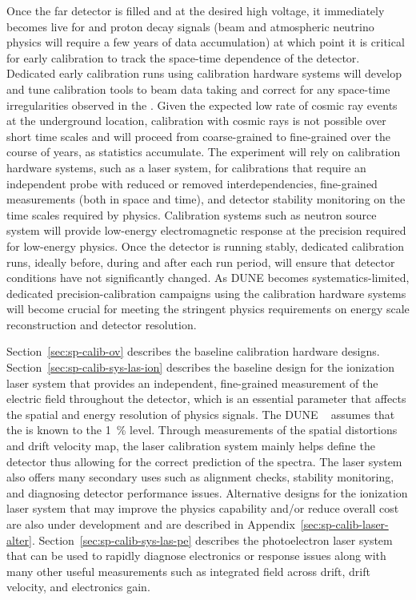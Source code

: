 Once the far detector is filled and at the desired high voltage, it immediately becomes live for  and proton decay signals (beam and atmospheric neutrino physics will require a few years of data accumulation) at which point it is critical for %
early calibration to track %
the space-time dependence of the detector. Dedicated early calibration runs using calibration hardware systems will develop and tune calibration tools to beam data taking and correct for any space-time irregularities observed in the . Given the expected low rate of cosmic ray events at the underground location, calibration with cosmic rays is not possible over short time scales and will proceed from coarse-grained to fine-grained over the course of years, as statistics accumulate. 
The experiment will rely on calibration hardware systems, such as a laser system, for calibrations that require an independent probe with reduced or removed interdependencies, fine-grained measurements (both in space and time), and detector stability monitoring on the time scales required by physics. Calibration systems such as neutron source system will provide low-energy electromagnetic response at the precision required for low-energy  physics. 
Once the detector is running stably, dedicated calibration runs, ideally before, during and after each run period, will ensure that detector conditions have not significantly changed. As DUNE becomes systematics-limited, dedicated precision-calibration campaigns using the calibration hardware systems will become crucial for meeting the stringent physics requirements on energy scale reconstruction and detector resolution.

Section~\ref{sec:sp-calib-ov} describes the baseline calibration hardware designs. Section~\ref{sec:sp-calib-sys-las-ion} describes the baseline design for the ionization laser system that provides an independent, fine-grained measurement of the electric field throughout the detector, which is an essential parameter that affects the spatial and energy resolution of physics signals. The DUNE ~\cite{Acciarri:2015uup} assumes that the  is known to the \SI{1}{\%} level. Through measurements of the spatial distortions and drift velocity map, the laser calibration system mainly helps define the detector  thus allowing for the correct prediction of the  spectra. The laser system also offers many secondary uses such as alignment checks, stability monitoring, and diagnosing detector performance issues. Alternative designs for the ionization laser system that may improve the physics capability and/or reduce overall cost are also under development and are described in Appendix~\ref{sec:sp-calib-laser-alter}.
Section~\ref{sec:sp-calib-sys-las-pe} describes the photoelectron laser system that can be used to rapidly diagnose electronics or  response issues along with many other useful measurements such as integrated field across drift, drift velocity, and electronics gain. 

